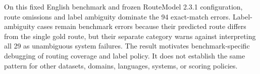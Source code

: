 On this fixed English benchmark and frozen RouteModel 2.3.1 configuration, route omissions and label ambiguity dominate the 94 exact-match errors. Label-ambiguity cases remain benchmark errors because their predicted route differs from the single gold route, but their separate category warns against interpreting all 29 as unambiguous system failures. The result motivates benchmark-specific debugging of routing coverage and label policy. It does not establish the same pattern for other datasets, domains, languages, systems, or scoring policies.
